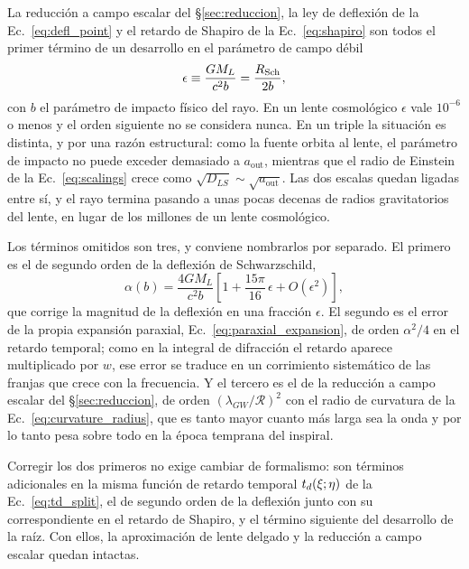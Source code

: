 \documentclass[11pt,a4paper,openany]{book}
\newcommand{\aout}{a_{\mathrm{out}}}
\begin{document}
La reducci\'on a campo escalar del \S\ref{sec:reduccion}, la ley de
deflexi\'on de la Ec.~\eqref{eq:defl_point} y el retardo de Shapiro de la
Ec.~\eqref{eq:shapiro} son todos el primer t\'ermino de un desarrollo en el
par\'ametro de campo d\'ebil
\begin{equation}
  \epsilon\equiv\frac{GM_L}{c^{2}b}=\frac{R_{\rm Sch}}{2b} ,
  \label{eq:epsilon}
\end{equation}
con $b$ el par\'ametro de impacto f\'isico del rayo. En un lente
cosmol\'ogico $\epsilon$ vale $10^{-6}$ o menos y el orden siguiente no se
considera nunca. En un triple la situaci\'on es distinta, y por una raz\'on
estructural: como la fuente orbita al lente, el par\'ametro de impacto no
puede exceder demasiado a $\aout$, mientras que el radio de Einstein de la
Ec.~\eqref{eq:scalings} crece como $\sqrt{D_{LS}}\sim\sqrt{\aout}$. Las dos
escalas quedan ligadas entre s\'i, y el rayo termina pasando a unas pocas
decenas de radios gravitatorios del lente, en lugar de los millones de un
lente cosmol\'ogico.

Los t\'erminos omitidos son tres, y conviene nombrarlos por separado. El
primero es el de segundo orden de la deflexi\'on de Schwarzschild,
\begin{equation}
  \alpha(b)=\frac{4GM_L}{c^{2}b}
  \left[1+\frac{15\pi}{16}\,\epsilon+O(\epsilon^{2})\right] ,
  \label{eq:deflection_2nd}
\end{equation}
que corrige la magnitud de la deflexi\'on en una fracci\'on $\epsilon$. El
segundo es el error de la propia expansi\'on paraxial,
Ec.~\eqref{eq:paraxial_expansion}, de orden $\alpha^{2}/4$ en el retardo
temporal; como en la integral de difracci\'on el retardo aparece multiplicado
por $w$, ese error se traduce en un corrimiento sistem\'atico de las franjas
que crece con la frecuencia. Y el tercero es el de la reducci\'on a campo
escalar del \S\ref{sec:reduccion}, de orden $(\lambda_{GW}/\mathcal{R})^{2}$
con el radio de curvatura de la Ec.~\eqref{eq:curvature_radius}, que es tanto
mayor cuanto m\'as larga sea la onda y por lo tanto pesa sobre todo en la
\'epoca temprana del inspiral.

Corregir los dos primeros no exige cambiar de formalismo: son t\'erminos
adicionales en la misma funci\'on de retardo temporal $t_d(\vb\xi;\vb\eta)$
de la Ec.~\eqref{eq:td_split}, el de segundo orden de la deflexi\'on junto con
su correspondiente en el retardo de Shapiro, y el t\'ermino siguiente del
desarrollo de la ra\'iz. Con ellos, la aproximaci\'on de lente delgado y la
reducci\'on a campo escalar quedan intactas.
\end{document}

